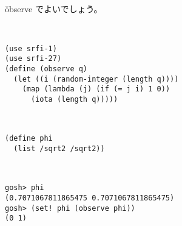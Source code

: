 \hline
\begin{minipage}{.01\hsize}
  ~
\end{minipage}
\begin{minipage}{.39\hsize}
  \v{observe} 
  でよいでしょう。
\end{minipage}
\begin{minipage}{.10\hsize}
  ~
\end{minipage}
\begin{minipage}{.39\hsize}
  \begin{verbatim}
(use srfi-1)
(use srfi-27)
(define (observe q)
  (let ((i (random-integer (length q))))
    (map (lambda (j) (if (= j i) 1 0))
      (iota (length q)))))
  \end{verbatim}
\end{minipage}


\hline
\begin{minipage}{.01\hsize}
  ~
\end{minipage}
\begin{minipage}{.39\hsize}
  \begin{verbatim}
(define phi
  (list /sqrt2 /sqrt2))
  \end{verbatim}
\end{minipage}
\begin{minipage}{.10\hsize}
  ~
\end{minipage}
\begin{minipage}{.39\hsize}
  \begin{verbatim}
gosh> phi
(0.7071067811865475 0.7071067811865475)
gosh> (set! phi (observe phi))
(0 1)
  \end{verbatim}
\end{minipage}




